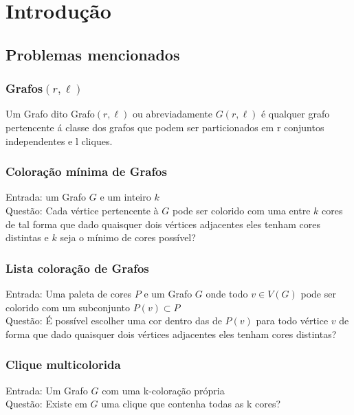\chapter{Introdução} \label{cap:intro}

\section{Problemas mencionados}

\subsection{Grafos$(r,\ell)$}
\begin{definition}
	Um Grafo dito Grafo$(r,\ell)$ ou abreviadamente $G(r,\ell)$ é qualquer grafo pertencente á classe dos grafos que podem ser particionados em r conjuntos independentes e l cliques.
\end{definition}

\subsection{Coloração mínima de Grafos}
\begin{definition}
	Entrada: um Grafo $G$ e um inteiro $k$\\
	Questão: Cada vértice pertencente à $G$ pode ser colorido com uma entre $k$ cores
	de tal forma que dado quaisquer dois vértices adjacentes eles tenham cores distintas e $k$ seja o mínimo de cores possível?
\end{definition}

\subsection{Lista coloração de Grafos}
\begin{definition}
  Entrada: Uma paleta de cores $P$ e um Grafo $G$ onde todo $v \in V(G)$ pode ser colorido com um subconjunto $P(v) \subset P$\\
  Questão: É possível escolher uma cor dentro das de $P(v)$ para todo vértice $v$ de forma que dado quaisquer dois vértices adjacentes eles tenham cores distintas?
\end{definition}

\subsection{Clique multicolorida}
\begin{definition}
 Entrada: Um Grafo $G$ com uma k-coloração própria\\
 Questão: Existe em $G$ uma clique que contenha todas as k cores?
\end{definition}

